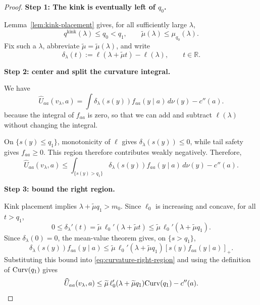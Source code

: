 \begin{proof}
\mbox{}\par
\noindent\textbf{Step 1: The kink is eventually left of $q_0$.}\par
Lemma~\ref{lem:kink-placement} gives, for all sufficiently large $\lambda$,
\[
    q^{\mathrm{kink}}(\lambda)\leq q_0<q_1,
    \qquad
    \widetilde\mu(\lambda)\leq\mu_{q_0}(\lambda).
\]
Fix such a $\lambda$, abbreviate
$\widetilde\mu=\widetilde\mu(\lambda)$, and write
\[
    \delta_\lambda(t):=
    \ell(\lambda+\widetilde\mu t)-\ell(\lambda),
    \qquad t\in\mathbb R.
\]

\noindent\textbf{Step 2: center and split the curvature integral.}\par
We have
\begin{equation}
 \widehat U_{aa}(v_\lambda,a)
 =\int \delta_\lambda(s(y))f_{aa}(y\mid a)\,d\nu(y)-c''(a).
 \label{eq:curvature-identity}
\end{equation}
because the integral of $f_{aa}$ is zero, so that we can add and subtract
$\ell(\lambda)$ without changing the integral.

On $\{s(y) \leq q_1\}$, monotonicity of $\ell$ gives
$\delta_\lambda(s(y))\leq0$, while tail safety gives $f_{aa}\geq0$.  This
region therefore contributes weakly negatively. Therefore,
\begin{equation}
 \widehat U_{aa}(v_\lambda,a)
 \leq\int_{\{s(y)>q_1\}}
 \delta_\lambda(s(y))f_{aa}(y\mid a)\,d\nu(y)-c''(a).
 \label{eq:curvature-right-region}
\end{equation}

\noindent\textbf{Step 3: bound the right region.}\par

Kink placement implies
$\lambda+\widetilde\mu q_1>m_0$.  Since $\ell_0$ is increasing and concave,
for all $t>q_1$,
\[
    0\leq\delta_\lambda'(t)
    =\widetilde\mu\,\ell_0'(\lambda+\widetilde\mu t)
    \leq\widetilde\mu\,\ell_0'(\lambda+\widetilde\mu q_1).
\]
Since $\delta_\lambda(0)=0$, the mean-value theorem gives, on
$\{s>q_1\}$,
\[
    \delta_\lambda(s(y))f_{aa}(y\mid a)
    \leq
    \widetilde\mu\,\ell_0'(\lambda+\widetilde\mu q_1)
    [s(y)f_{aa}(y\mid a)]_+.
\]
Substituting this bound into \eqref{eq:curvature-right-region} and using the
definition of $\mathrm{Curv}(q_1)$ gives
\begin{equation}
 \widehat U_{aa}(v_\lambda,a)
 \leq
 \widetilde\mu\,\ell_0'(\lambda+\widetilde\mu q_1)\mathrm{Curv}(q_1)-c''(a).
 \label{eq:curvature-split}
\end{equation}


\end{proof}
